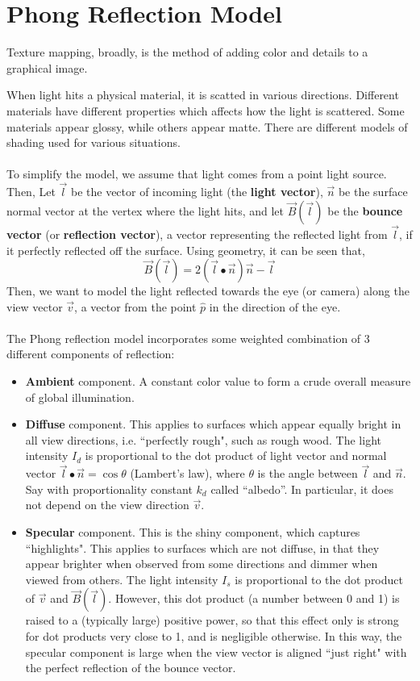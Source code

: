 \documentclass[letterpaper,12pt]{article}
\begin{document}
\section*{Phong Reflection Model}
Texture mapping, broadly, is the method of adding color and details to a graphical image.

When light hits a physical material, it is scatted in various directions. Different materials have different properties which affects how the light is scattered. Some materials appear glossy, while others appear matte. There are different models of shading used for various situations.
\\ \\ To simplify the model, we assume that light comes from a point light source. Then, Let $\vec{l}$ be the vector of incoming light (the \textbf{light vector}), $\vec{n}$ be the surface normal vector at the vertex where the light hits, and let $\vec{B}(\vec{l})$ be the \textbf{bounce vector} (or \textbf{reflection vector}), a vector representing the reflected light from $\vec{l}$, if it perfectly reflected off the surface. Using geometry, it can be seen that,
\begin{equation*}
    \vec{B}(\vec{l}) = 2(\vec{l} \bullet \vec{n}) \vec{n} - \vec{l}
\end{equation*}
Then, we want to model the light reflected towards the eye (or camera) along the view vector $\vec{v}$, a vector from the point $\hat{p}$ in the direction of the eye.
\\ \\ The Phong reflection model incorporates some weighted combination of 3 different components of reflection:
\begin{itemize}
    \item \textbf{Ambient} component. A constant color value to form a crude overall measure of global illumination.
    \item \textbf{Diffuse} component. This applies to surfaces which appear equally bright in all view directions, i.e. ``perfectly rough", such as rough wood. The light intensity $I_d$ is proportional to the dot product of light vector and normal vector $\vec{l} \bullet \vec{n} = \cos{\theta}$ (Lambert’s law), where $\theta$ is the angle between $\vec{l}$ and $\vec{n}$. Say with proportionality constant $k_d$ called “albedo”. In particular, it does not depend on the view direction $\vec{v}$.
    \item \textbf{Specular} component. This is the shiny component, which captures ``highlights". This applies to surfaces which are not diffuse, in that they appear brighter when observed from some directions and dimmer when viewed from others. The light intensity $I_s$ is proportional to the dot product of $\vec{v}$ and $\vec{B}(\vec{l})$. However, this dot product (a number between 0 and 1) is raised to a (typically large) positive power, so that this effect only is strong for dot products very close to 1, and is negligible otherwise. In this way, the specular component is large when the view vector is aligned ``just right" with the perfect reflection of the bounce vector.
\end{itemize}
\end{document}

